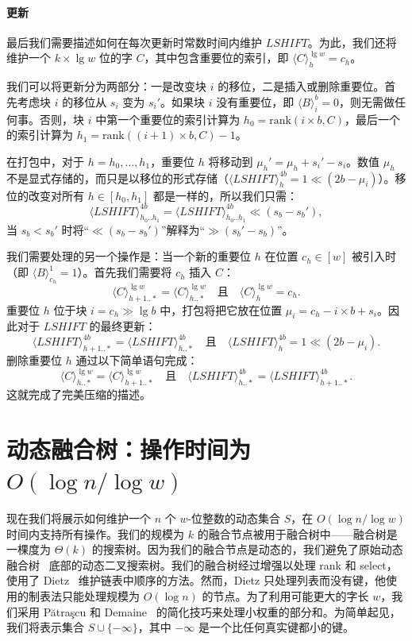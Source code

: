 \documentclass[11pt,a4paper]{ctexart}
\newcommand{\ttl}{\text{1}}
\newcommand{\lpiece}[3]{\langle #1 \rangle_{#2}^{#3}}
\newcommand{\LSHIFT}{\ll}
\newcommand{\RSHIFT}{\gg}
\newcommand{\RANK}{\text{rank}}
\begin{document}
\paragraph{更新}
最后我们需要描述如何在每次更新时常数时间内维护 $LSHIFT$。为此，我们还将维护一个 $k \times \lg w$ 位的字 $C$，其中包含重要位的索引，即 $\lpiece{C}{h}{\lg w} = c_h$。

我们可以将更新分为两部分：一是改变块 $i$ 的移位，二是插入或删除重要位。首先考虑块 $i$ 的移位从 $s_i$ 变为 $s_i'$。如果块 $i$ 没有重要位，即 $\lpiece{B}{i}{b} = 0$，则无需做任何事。否则，块 $i$ 中第一个重要位的索引计算为 $h_0 = \RANK(i \times b, C)$，最后一个的索引计算为 $h_1 = \RANK((i+1) \times b, C) - 1$。

在打包中，对于 $h = h_0, \dots, h_1$，重要位 $h$ 将移动到 $\mu_h' = \mu_h + s_i' - s_i$。数值 $\mu_h$ 不是显式存储的，而只是以移位的形式存储（$\lpiece{LSHIFT}{h}{4b} = \ttl \LSHIFT (2b - \mu_i)$）。移位的改变对所有 $h \in [h_0, h_1]$ 都是一样的，所以我们只需：
\[
\lpiece{LSHIFT}{h_0..h_1}{4b} = \lpiece{LSHIFT}{h_0..h_1}{4b} \LSHIFT (s_b - s_b'),
\]
当 $s_b < s_b'$ 时将``$\LSHIFT (s_b - s_b')$''解释为``$\RSHIFT (s_b' - s_b)$''。

我们需要处理的另一个操作是：当一个新的重要位 $h$ 在位置 $c_h \in [w]$ 被引入时（即 $\lpiece{B}{c_h}{1} = \ttl$）。首先我们需要将 $c_h$ 插入 $C$：
\[
\lpiece{C}{h+1..*}{\lg w} = \lpiece{C}{h..*}{\lg w} \quad \text{且} \quad \lpiece{C}{h}{\lg w} = c_h.
\]
重要位 $h$ 位于块 $i = c_h \RSHIFT \lg b$ 中，打包将把它放在位置 $\mu_i = c_h - i \times b + s_i$。因此对于 $LSHIFT$ 的最终更新：
\[
\lpiece{LSHIFT}{h+1..*}{4b} = \lpiece{LSHIFT}{h..*}{4b} \quad \text{且} \quad \lpiece{LSHIFT}{h}{4b} = 1 \LSHIFT (2b - \mu_i).
\]
删除重要位 $h$ 通过以下简单语句完成：
\[
\lpiece{C}{h..*}{\lg w} = \lpiece{C}{h+1..*}{\lg w} \quad \text{且} \quad \lpiece{LSHIFT}{h..*}{4b} = \lpiece{LSHIFT}{h+1..*}{4b}.
\]
这就完成了完美压缩的描述。

\section{动态融合树：操作时间为 $O(\log n/\log w)$}\label{sec:set-n}

现在我们将展示如何维护一个 $n$ 个 $w$-位整数的动态集合 $S$，在 $O(\log n/\log w)$ 时间内支持所有操作。我们的规模为 $k$ 的融合节点被用于融合树中——融合树是一棵度为 $\Theta(k)$ 的搜索树。因为我们的融合节点是动态的，我们避免了原始动态融合树~\cite{fredman93fusion} 底部的动态二叉搜索树。我们的融合树经过增强以处理 rank 和 select，使用了 Dietz~\cite{dietz89sums} 维护链表中顺序的方法。然而，Dietz 只处理列表而没有键，他使用的制表法只能处理规模为 $O(\log n)$ 的节点。为了利用可能更大的字长 $w$，我们采用 P\u{a}tra\c{s}cu 和 Demaine~\cite[第8节]{patrascu04connect} 的简化技巧来处理小权重的部分和。为简单起见，我们将表示集合 $S \cup \{-\infty\}$，其中 $-\infty$ 是一个比任何真实键都小的键。
\end{document}
